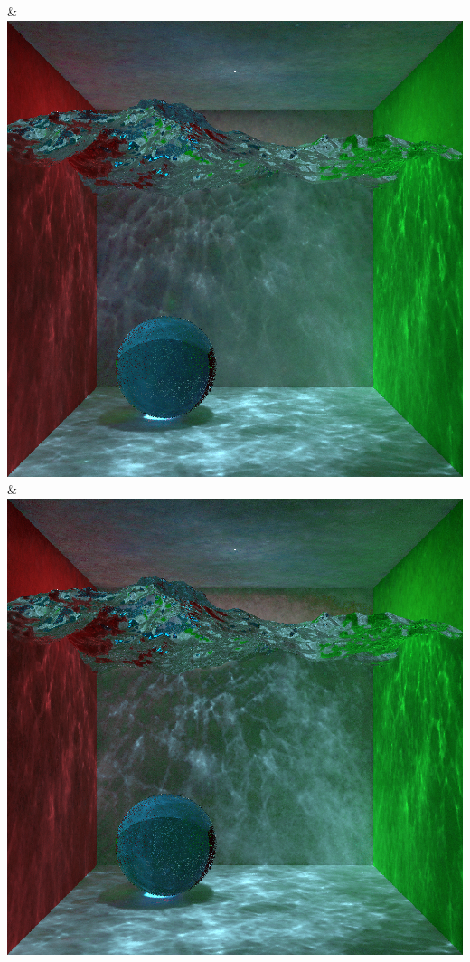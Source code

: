 & \includegraphics[width=\linewidth]{figures/py/tests/quality_comparison/nrc+sppc16@1_1spp_caustics_small.png}
& \includegraphics[width=\linewidth]{figures/py/tests/quality_comparison/nrc+sppc16@4_1spp_caustics_small.png}
